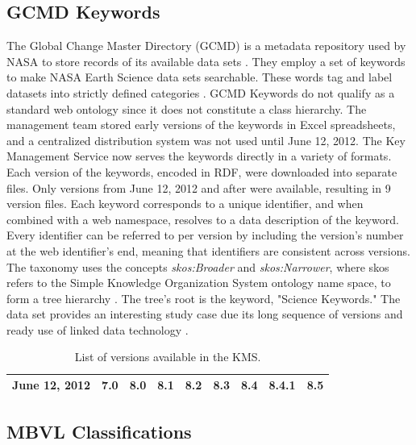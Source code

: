 \subsection{GCMD Keywords}

The Global Change Master Directory (GCMD) is a metadata repository used by NASA to store records of its available data sets \cite{Miled:2001:GCM:372202.372324}.
They employ a set of keywords to make NASA Earth Science data sets searchable.
These words tag and label datasets into strictly defined categories \cite{GCMDKey}.
GCMD Keywords do not qualify as a standard web ontology since it does not constitute a class hierarchy.
The management team stored early versions of the keywords in Excel spreadsheets, and a centralized distribution system was not used until June 12, 2012.
The Key Management Service now serves the keywords directly in a variety of formats.
Each version of the keywords, encoded in RDF, were downloaded into separate files.
Only versions from June 12, 2012 and after were available, resulting in 9 version files.
Each keyword corresponds to a unique identifier, and when combined with a web namespace, resolves to a data description of the keyword.
Every identifier can be referred to per version by including the version's number at the web identifier's end, meaning that identifiers are consistent across versions.
The taxonomy uses the concepts \textit{skos:Broader} and \textit{skos:Narrower}, where skos refers to the Simple Knowledge Organization System ontology name space, to form a tree hierarchy \cite{skos}.
The tree's root is the keyword, "Science Keywords."
The data set provides an interesting study case due its long sequence of versions and ready use of linked data technology \cite{Stevens2016}.

\begin{table}
	\caption{List of versions available in the KMS.}
	\label{gcmd_table}
	\centering
	\begin{tabular}{|c|c|c|c|c|c|c|c|c|}
		\hline
		June 12, 2012 & 7.0 & 8.0 & 8.1 & 8.2 & 8.3 & 8.4 & 8.4.1 & 8.5 \\
		\hline
	\end{tabular}
\end{table}

\subsection{MBVL Classifications} \label{sec:MBVL}


